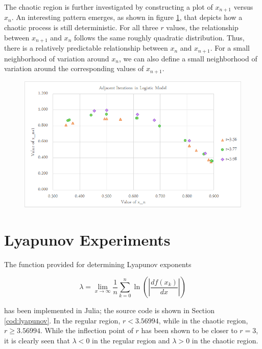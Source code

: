 \documentclass[a4paper]{article}
\begin{document}
The chaotic region is further investigated by constructing a plot of $x_{n+1}$ versus $x_n$. An interesting pattern emerges, as shown in figure \ref{chaos_n1vn}, that depicts how a chaotic process is still deterministic. For all three $r$ values, the relationship between $x_{n+1}$ and $x_n$ follows the same roughly quadratic distribution. Thus, there is a relatively predictable relationship between $x_n$ and $x_{n+1}$. For a small neighborhood of variation around $x_n$, we can also define a small neighborhood of variation around the corresponding values of $x_{n+1}$.

\begin{figure}[H]
\centering
\includegraphics[width=1\textwidth]{chaos_n1vn.png}
\label{chaos_n1vn}
\end{figure}

\section{Lyapunov Experiments}

\qq The function provided for determining Lyapunov exponents

\begin{equation*}
  \lambda = \lim\limits_{x \rightarrow \infty} \frac{1}{n} \sum^n_{k=0} 
  \ln \left( \left| \frac{d f(x_k)}{dx} \right| \right)
\end{equation*}

has been implemented in Julia; the source code is shown in Section
\ref{cod:lyapunov}. In the regular region, \( r < 3.56994 \), while in the
chaotic region, \( r \geq 3.56994 \). While the inflection point of \( r \) has
been shown to be closer to \( r = 3 \), it is clearly seen that \( \lambda < 0
\) in the regular region and \( \lambda > 0 \) in the chaotic region.
\end{document}
